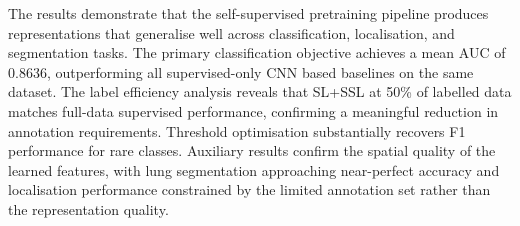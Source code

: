 The results demonstrate that the self-supervised pretraining pipeline produces representations that generalise well across classification, localisation, and segmentation tasks. The primary classification objective achieves a mean AUC of 0.8636, outperforming all supervised-only CNN based baselines on the same dataset. The label efficiency analysis reveals that SL+SSL at 50\% of labelled data matches full-data supervised performance, confirming a meaningful reduction in annotation requirements. Threshold optimisation substantially recovers F1 performance for rare classes. Auxiliary results confirm the spatial quality of the learned features, with lung segmentation approaching near-perfect accuracy and localisation performance constrained by the limited annotation set rather than the representation quality.